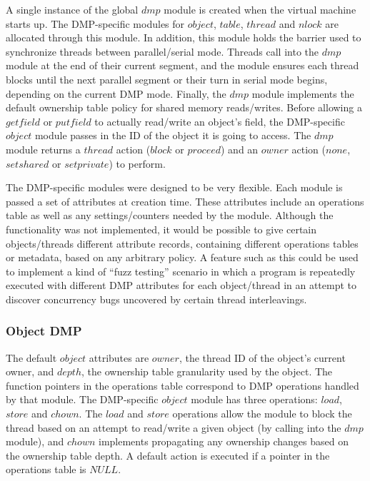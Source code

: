 
A single instance of the global $dmp$ module is created when the
virtual machine starts up.  The DMP-specific modules for $object$,
$table$, $thread$ and $nlock$ are allocated through this module.  In
addition, this module holds the barrier used to synchronize threads
between parallel/serial mode.  Threads call into the $dmp$ module at
the end of their current segment, and the module ensures each thread
blocks until the next parallel segment or their turn in serial mode
begins, depending on the current DMP mode.  Finally, the $dmp$ module
implements the default ownership table policy for shared memory
reads/writes.  Before allowing a $getfield$ or $putfield$ to actually
read/write an object's field, the DMP-specific $object$ module passes
in the ID of the object it is going to access.  The $dmp$ module
returns a $thread$ action ($block$ or $proceed$) and an $owner$ action
($none$, $set shared$ or $set private$) to perform.

The DMP-specific modules were designed to be very flexible.  Each
module is passed a set of attributes at creation time.  These
attributes include an operations table as well as any
settings/counters needed by the module.  Although the functionality
was not implemented, it would be possible to give certain
objects/threads different attribute records, containing different
operations tables or metadata, based on any arbitrary policy.  A
feature such as this could be used to implement a kind of ``fuzz
testing'' scenario in which a program is repeatedly executed with
different DMP attributes for each object/thread in an attempt to
discover concurrency bugs uncovered by certain thread interleavings.

\subsubsection{Object DMP}

The default $object$ attributes are $owner$, the thread ID of the
object's current owner, and $depth$, the ownership table granularity
used by the object.  The function pointers in the operations table
correspond to DMP operations handled by that module.  The DMP-specific
$object$ module has three operations: $load$, $store$ and $chown$.
The $load$ and $store$ operations allow the module to block the thread
based on an attempt to read/write a given object (by calling into the
$dmp$ module), and $chown$ implements propagating any ownership
changes based on the ownership table depth.  A default action is
executed if a pointer in the operations table is $NULL$.

